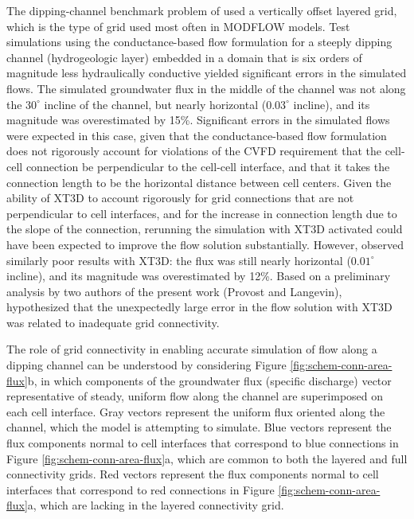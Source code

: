 \documentclass{article}
\begin{document}
The dipping-channel benchmark problem of \cite{bardot2022} used a vertically offset layered grid, which is the type of grid used most often in MODFLOW models. Test simulations using the conductance-based flow formulation for a steeply dipping channel (hydrogeologic layer) embedded in a domain that is six orders of magnitude less hydraulically conductive yielded significant errors in the simulated flows. The simulated groundwater flux in the middle of the channel was not along the $30^{\circ}$ incline of the channel, but nearly horizontal ($0.03^{\circ}$ incline), and its magnitude was overestimated by 15\%. Significant errors in the simulated flows were expected in this case, given that the conductance-based flow formulation does not rigorously account for violations of the CVFD requirement that the cell-cell connection be perpendicular to the cell-cell interface, and that it takes the connection length to be the horizontal distance between cell centers.  Given the ability of XT3D to account rigorously for grid connections that are not perpendicular to cell interfaces, and for the increase in connection length due to the slope of the connection, rerunning the simulation with XT3D activated could have been expected to improve the flow solution substantially. However, \cite{bardot2022} observed similarly poor results with XT3D: the flux was still nearly horizontal ($0.01^{\circ}$ incline), and its magnitude was overestimated by 12\%. Based on a preliminary analysis by two authors of the present work (Provost and Langevin), \cite{bardot2022} hypothesized that the unexpectedly large error in the flow solution with XT3D was related to inadequate grid connectivity.

The role of grid connectivity in enabling accurate simulation of flow along a dipping channel can be understood by considering Figure \ref{fig:schem-conn-area-flux}b, in which components of the groundwater flux (specific discharge) vector representative of steady, uniform flow along the channel are superimposed on each cell interface. Gray vectors represent the uniform flux oriented along the channel, which the model is attempting to simulate. Blue vectors represent the flux components normal to cell interfaces that correspond to blue connections in Figure \ref{fig:schem-conn-area-flux}a, which are common to both the layered and full connectivity grids. Red vectors represent the flux components normal to cell interfaces that correspond to red connections in Figure \ref{fig:schem-conn-area-flux}a, which are lacking in the layered connectivity grid.
\end{document}
